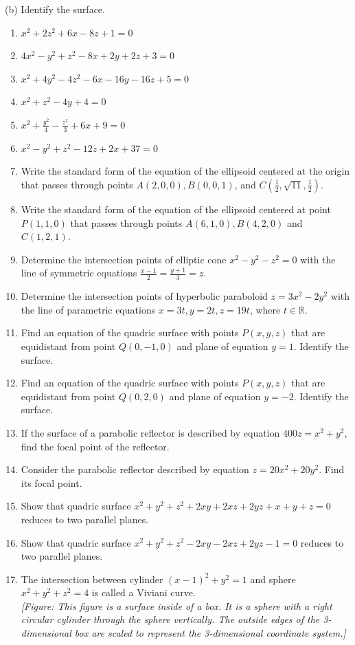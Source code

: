 \documentclass{exercises}
\begin{document}
(b) Identify the surface.

\begin{enumerate}[resume]
\item $x^{2}+2z^{2}+6x-8z+1=0$
\item $4x^{2}-y^{2}+z^{2}-8x+2y+2z+3=0$
\item $x^{2}+4y^{2}-4z^{2}-6x-16y-16z+5=0$
\item $x^{2}+z^{2}-4y+4=0$
\item $x^{2}+\frac{y^{2}}{4}-\frac{z^{2}}{3}+6x+9=0$
\item $x^{2}-y^{2}+z^{2}-12z+2x+37=0$
\item Write the standard form of the equation of the ellipsoid centered at the origin that passes through points $A(2,0,0),B(0,0,1)$, and $C(\frac{1}{2},\sqrt{11},\frac{1}{2})$.
\item Write the standard form of the equation of the ellipsoid centered at point $P(1,1,0)$ that passes through points $A(6,1,0),B(4,2,0)$ and $C(1,2,1)$.
\item Determine the intersection points of elliptic cone $x^{2}-y^{2}-z^{2}=0$ with the line of symmetric equations $\frac{x-1}{2}=\frac{y+1}{3}=z$.
\item Determine the intersection points of hyperbolic paraboloid $z=3x^{2}-2y^{2}$ with the line of parametric equations $x=3t,y=2t,z=19t$, where $t\in \mathbb{R}$.
\item Find an equation of the quadric surface with points $P(x,y,z)$ that are equidistant from point $Q(0,-1,0)$ and plane of equation $y=1$. Identify the surface.
\item Find an equation of the quadric surface with points $P(x,y,z)$ that are equidistant from point $Q(0,2,0)$ and plane of equation $y=-2$. Identify the surface.
\item If the surface of a parabolic reflector is described by equation $400z=x^{2}+y^{2}$, find the focal point of the reflector.
\item Consider the parabolic reflector described by equation $z=20x^{2}+20y^{2}$. Find its focal point.
\item Show that quadric surface $x^{2}+y^{2}+z^{2}+2xy+2xz+2yz+x+y+z=0$ reduces to two parallel planes.
\item Show that quadric surface $x^{2}+y^{2}+z^{2}-2xy-2xz+2yz-1=0$ reduces to two parallel planes.
\item \techrequired The intersection between cylinder ${(x-1)}^{2}+y^{2}=1$ and sphere $x^{2}+y^{2}+z^{2}=4$ is called a Viviani curve. \\ \textit{[Figure: This figure is a surface inside of a box. It is a sphere with a right circular cylinder through the sphere vertically. The outside edges of the 3-dimensional box are scaled to represent the 3-dimensional coordinate system.]}

\end{enumerate}
\end{document}
